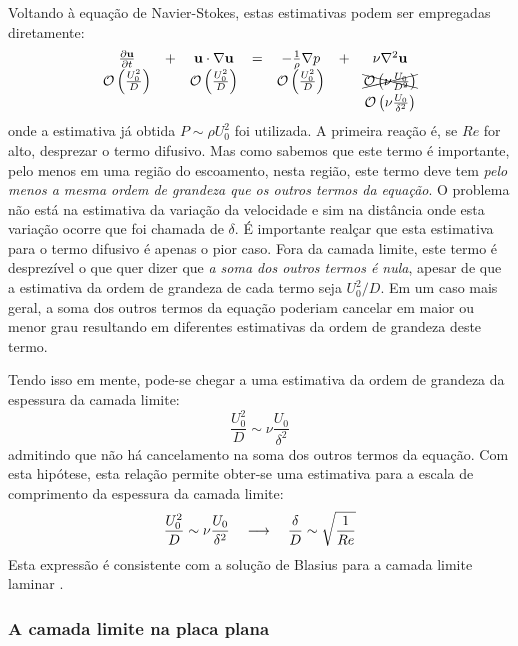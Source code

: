 Voltando à equação de Navier-Stokes, estas estimativas podem ser empregadas diretamente:
\begin{equation}
\begin{matrix}
\frac{\partial \mathbf{u}}{\partial t}& +&  \mathbf{u}\cdot\nabla \mathbf{u}& = &-\frac{1}{\rho}\nabla p& +& \nu\nabla^2 \mathbf{u}\\
\mathcal{O}\left(\frac{U_0^2}{D}\right)& & \mathcal{O}\left(\frac{U_0^2}{D}\right) &  & \mathcal{O}\left(\frac{U_0^2}{D}\right)&  & \xcancel{\mathcal{O}\left(\nu\frac{U_0}{D^2}\right)} \\
 & & & & & & \mathcal{O}\left(\nu\frac{U_0}{\delta^2}\right)\\
\end{matrix}
\label{eq:ns-o}
\end{equation}
onde a estimativa já obtida $P\sim \rho U_0^2$ foi utilizada. A primeira reação é, se $Re$ for alto, desprezar o termo difusivo. Mas como sabemos que este termo é importante, pelo menos em uma região do escoamento, nesta região, este termo deve tem \emph{pelo menos a mesma ordem de grandeza que os outros termos da equação}. O problema não está na estimativa da variação da velocidade e sim na distância onde esta variação ocorre que foi chamada de $\delta$. É importante realçar que esta estimativa para o termo difusivo é apenas o pior caso. Fora da camada limite, este termo é desprezível o que quer dizer que \emph{a soma dos outros termos é nula}, apesar de que a estimativa da ordem de grandeza de cada termo seja $U_0^2/D$. Em um caso mais geral, a soma dos outros termos da equação poderiam cancelar em maior ou menor grau resultando em diferentes estimativas da ordem de grandeza deste termo.

Tendo isso em mente, pode-se chegar a uma estimativa da ordem de grandeza da espessura da camada limite:
\[
\frac{U_0^2}{D} \sim \nu\frac{U_0}{\delta^2}
\]
admitindo que não há cancelamento na soma dos outros termos da equação. Com esta hipótese, esta relação permite obter-se uma estimativa para a escala de comprimento da espessura da camada limite:
\begin{equation}
\frac{U_0^2}{D} \sim \nu\frac{U_0}{\delta^2} \quad\longrightarrow\quad \frac{\delta}{D} \sim \sqrt{\frac{1}{Re}}
\label{eq:delta}
\end{equation}
Esta expressão é consistente com a solução de Blasius para a camada limite laminar \cite{Tritton88}.



\subsubsection{A camada limite na placa plana}

